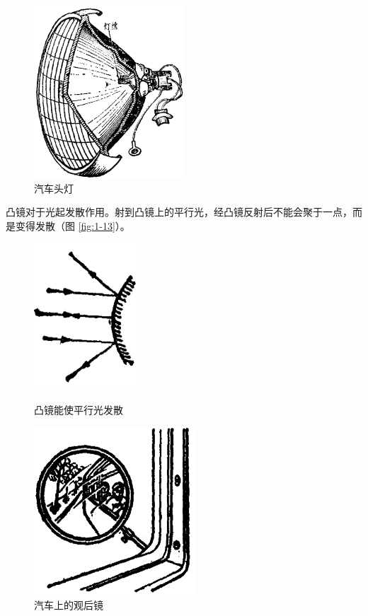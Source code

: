 \begin{figure}[htbp]
    \centering
    \includegraphics[width=0.5\textwidth]{../pic/czwl2-ch1-12}
    \caption{汽车头灯}\label{fig:1-12}
\end{figure}


凸镜对于光起发散作用。射到凸镜上的平行光，经凸镜反射后不能会聚于一点，而是变得发散（图 \ref{fig:1-13}）。

\begin{figure}[htbp]
    \centering
    \begin{minipage}{7cm}
    \centering
    \includegraphics[width=4cm]{../pic/czwl2-ch1-13}
    \caption{凸镜能使平行光发散}\label{fig:1-13}
    \end{minipage}
    \qquad
    \begin{minipage}{7cm}
    \centering
    \includegraphics[width=6cm]{../pic/czwl2-ch1-14}
    \caption{汽车上的观后镜}\label{fig:1-14}
    \end{minipage}
\end{figure}

